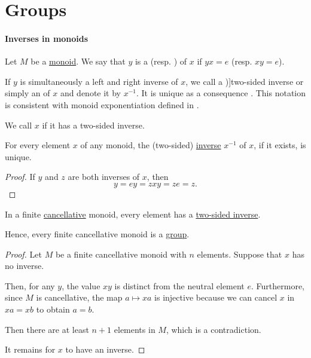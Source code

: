 \section{Groups}\label{sec:groups}

\paragraph{Inverses in monoids}

\begin{definition}\label{def:monoid_inverse}
  Let \( M \) be a \hyperref[def:monoid]{monoid}. We say that \( y \) is a  (resp. ) of \( x \) if \( yx = e \) (resp. \( xy = e \)).

  If \( y \) is simultaneously a left and right inverse of \( x \), we call a \term[ru=двусторонне обратный (\cite[71]{Ляпин1960Полугруппы})]{two-sided inverse} or simply an  of \( x \) and denote it by \( x^{-1} \). It is unique as a consequence . This notation is consistent with monoid exponentiation defined in .

  We call \( x \)  if it has a two-sided inverse.
\end{definition}

\begin{proposition}\label{thm:monoid_inverse_unique}
  For every element \( x \) of any monoid, the (two-sided) \hyperref[def:monoid_inverse]{inverse} \( x^{-1} \) of \( x \), if it exists, is unique.
\end{proposition}
\begin{proof}
  If \( y \) and \( z \) are both inverses of \( x \), then
  \begin{equation*}
    y = ey = zxy = ze = z.
  \end{equation*}
\end{proof}

\begin{proposition}\label{thm:finite_cancellative_monoid_inverse}
  In a finite \hyperref[def:binary_operation/cancellative]{cancellative} monoid, every element has a \hyperref[def:monoid_inverse]{two-sided inverse}.
\end{proposition}
\begin{comments}
  \item Hence, every finite cancellative monoid is a \hyperref[def:group]{group}.
\end{comments}
\begin{proof}
  Let \( M \) be a finite cancellative monoid with \( n \) elements. Suppose that \( x \) has no inverse.

  Then, for any \( y \), the value \( xy \) is distinct from the neutral element \( e \). Furthermore, since \( M \) is cancellative, the map \( a \mapsto xa \) is injective because we can cancel \( x \) in \( xa = xb \) to obtain \( a = b \).

  Then there are at least \( n + 1 \) elements in \( M \), which is a contradiction.

  It remains for \( x \) to have an inverse.
\end{proof}

